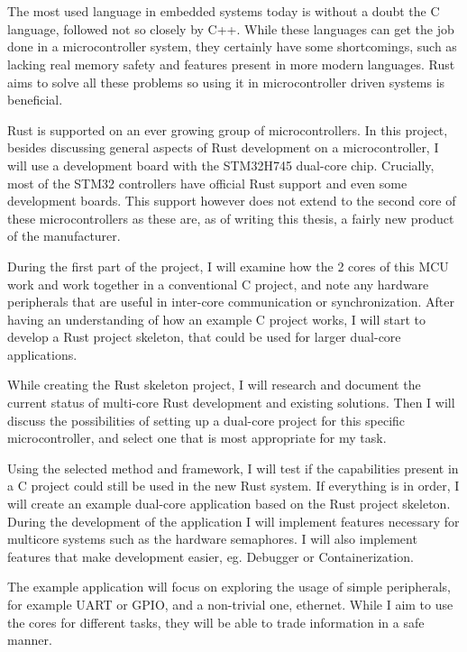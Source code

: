 \chapter{\bevezetes}

The most used language in embedded systems today is without a doubt the C language, followed not so closely by C++. While these languages can get the job done in a microcontroller system, they certainly have some shortcomings, such as lacking real memory safety and features present in more modern languages. Rust aims to solve all these problems so using it in microcontroller driven systems is beneficial.

Rust is supported on an ever growing group of microcontrollers. In this project, besides discussing general aspects of Rust development on a microcontroller, I will use a development board with the STM32H745 dual-core chip. Crucially, most of the STM32 controllers have official Rust support and even some development boards. This support however does not extend to the second core of these microcontrollers as these are, as of writing this thesis, a fairly new product of the manufacturer.

During the first part of the project, I will examine how the 2 cores of this MCU work and work together in a conventional C project, and note any hardware peripherals that are useful in inter-core communication or synchronization. After having an understanding of how an example C project works, I will start to develop a Rust project skeleton, that could be used for larger dual-core applications.

While creating the Rust skeleton project, I will research and document the current status of multi-core Rust development and existing solutions. Then I will discuss the possibilities of setting up a dual-core project for this specific microcontroller, and select one that is most appropriate for my task.

Using the selected method and framework, I will test if the capabilities present in a C project could still be used in the new Rust system. If everything is in order, I will create an example dual-core application based on the Rust project skeleton. During the development of the application I will implement features necessary for multicore systems such as the hardware semaphores. I will also implement features that make development easier, eg. Debugger or Containerization.

The example application will focus on exploring the usage of simple peripherals, for example UART or GPIO, and a non-trivial one, ethernet. While I aim to use the cores for different tasks, they will be able to trade information in a safe manner.
